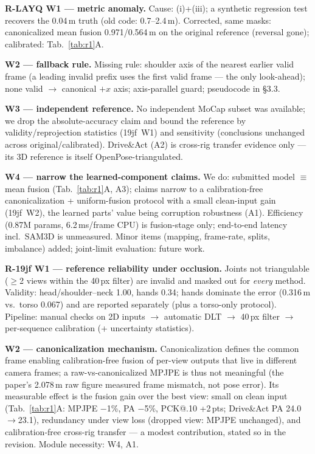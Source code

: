 \documentclass[10pt,twocolumn,letterpaper]{article}
\newcommand{\rpoint}[1]{\noindent\textbf{#1}\;}
\begin{document}
\rpoint{R-LAYQ W1 --- metric anomaly.}
Cause: (i)+(iii); a synthetic regression test recovers the 0.04\,m truth (old code: 0.7--2.4\,m). Corrected, same masks: canonicalized mean fusion 0.971/0.564\,m on the original reference (reversal gone); calibrated: Tab.~\ref{tab:r1}A.

\rpoint{W2 --- fallback rule.}
Missing rule: shoulder axis of the nearest earlier valid frame (a leading invalid prefix uses the first valid frame --- the only look-ahead); none valid $\to$ canonical $+x$ axis; axis-parallel guard; pseudocode in \S3.3.

\rpoint{W3 --- independent reference.}
No independent MoCap subset was available; we drop the absolute-accuracy claim and bound the reference by validity/reprojection statistics (19jf~W1) and sensitivity (conclusions unchanged across original/calibrated). Drive\&Act (A2) is cross-rig transfer evidence only --- its 3D reference is itself OpenPose-triangulated.

\rpoint{W4 --- narrow the learned-component claims.}
We do: submitted model $\equiv$ mean fusion (Tab.~\ref{tab:r1}A, A3); claims narrow to a calibration-free canonicalization + uniform-fusion protocol with a small clean-input gain (19jf~W2), the learned parts' value being corruption robustness (A1). Efficiency (0.87M params, 6.2\,ms/frame CPU) is fusion-stage only; end-to-end latency incl.\ SAM3D is unmeasured. Minor items (mapping, frame-rate, splits, imbalance) added; joint-limit evaluation: future work.

\rpoint{R-19jf W1 --- reference reliability under occlusion.}
Joints not triangulable ($\ge$2 views within the 40\,px filter) are invalid and masked out for \emph{every} method. Validity: head/shoulder--neck 1.00, hands 0.34; hands dominate the error (0.316\,m vs.\ torso 0.067) and are reported separately (plus a torso-only protocol). Pipeline: manual checks on 2D inputs $\to$ automatic DLT $\to$ 40\,px filter $\to$ per-sequence calibration (+ uncertainty statistics).

\rpoint{W2 --- canonicalization mechanism.}
Canonicalization defines the common frame enabling calibration-free fusion of per-view outputs that live in different camera frames; a raw-vs-canonicalized MPJPE is thus not meaningful (the paper's 2.078\,m raw figure measured frame mismatch, not pose error). Its measurable effect is the fusion gain over the best view: small on clean input (Tab.~\ref{tab:r1}A: MPJPE $-$1\%, PA $-$5\%, PCK@.10 +2\,pts; Drive\&Act PA 24.0$\to$23.1), redundancy under view loss (dropped view: MPJPE unchanged), and calibration-free cross-rig transfer --- a modest contribution, stated so in the revision. Module necessity: W4, A1.
\end{document}
